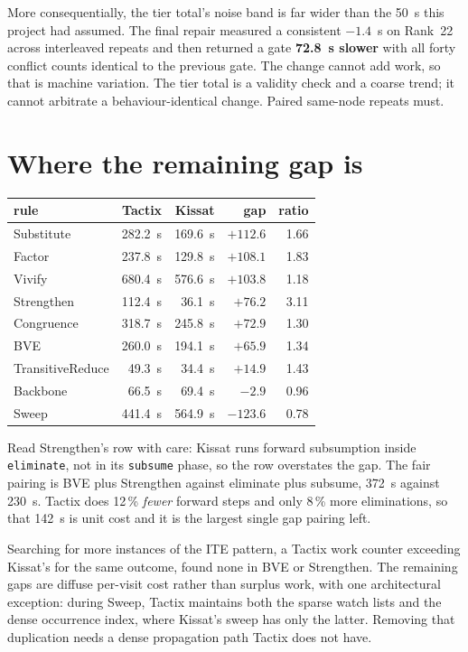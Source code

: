 \documentclass[11pt]{article}
\newcommand{\code}[1]{\texttt{#1}}
\begin{document}
More consequentially, the tier total's noise band is far wider than the 50~s
this project had assumed. The final repair measured a consistent $-1.4$~s on
Rank~22 across interleaved repeats and then returned a gate \textbf{72.8~s
slower} with all forty conflict counts identical to the previous gate. The
change cannot add work, so that is machine variation. The tier total is a
validity check and a coarse trend; it cannot arbitrate a behaviour-identical
change. Paired same-node repeats must.

\section{Where the remaining gap is}

\begin{center}
\begin{tabular}{lrrrr}
\toprule
rule & Tactix & Kissat & gap & ratio \\
\midrule
Substitute        & 282.2~s & 169.6~s & $+112.6$ & 1.66 \\
Factor            & 237.8~s & 129.8~s & $+108.1$ & 1.83 \\
Vivify            & 680.4~s & 576.6~s & $+103.8$ & 1.18 \\
Strengthen        & 112.4~s & 36.1~s  & $+76.2$  & 3.11 \\
Congruence        & 318.7~s & 245.8~s & $+72.9$  & 1.30 \\
BVE               & 260.0~s & 194.1~s & $+65.9$  & 1.34 \\
TransitiveReduce  & 49.3~s  & 34.4~s  & $+14.9$  & 1.43 \\
Backbone          & 66.5~s  & 69.4~s  & $-2.9$   & 0.96 \\
Sweep             & 441.4~s & 564.9~s & $-123.6$ & 0.78 \\
\bottomrule
\end{tabular}
\end{center}

Read Strengthen's row with care: Kissat runs forward subsumption inside
\code{eliminate}, not in its \code{subsume} phase, so the row overstates the
gap. The fair pairing is BVE plus Strengthen against eliminate plus subsume,
372~s against 230~s. Tactix does 12\,\% \emph{fewer} forward steps and only
8\,\% more eliminations, so that 142~s is unit cost and it is the largest
single gap pairing left.

Searching for more instances of the ITE pattern, a Tactix work counter
exceeding Kissat's for the same outcome, found none in BVE or Strengthen. The
remaining gaps are diffuse per-visit cost rather than surplus work, with one
architectural exception: during Sweep, Tactix maintains both the sparse watch
lists and the dense occurrence index, where Kissat's sweep has only the latter.
Removing that duplication needs a dense propagation path Tactix does not have.
\end{document}
